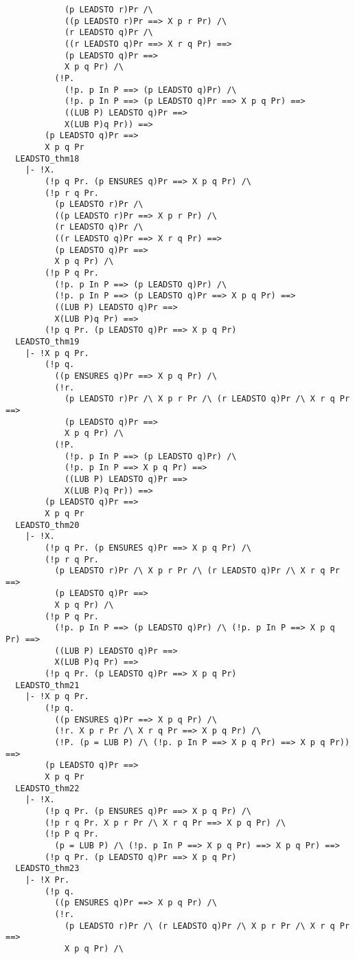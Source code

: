 {\begin{verbatim}
            (p LEADSTO r)Pr /\
            ((p LEADSTO r)Pr ==> X p r Pr) /\
            (r LEADSTO q)Pr /\
            ((r LEADSTO q)Pr ==> X r q Pr) ==>
            (p LEADSTO q)Pr ==>
            X p q Pr) /\
          (!P.
            (!p. p In P ==> (p LEADSTO q)Pr) /\
            (!p. p In P ==> (p LEADSTO q)Pr ==> X p q Pr) ==>
            ((LUB P) LEADSTO q)Pr ==>
            X(LUB P)q Pr)) ==>
        (p LEADSTO q)Pr ==>
        X p q Pr
  LEADSTO_thm18
    |- !X.
        (!p q Pr. (p ENSURES q)Pr ==> X p q Pr) /\
        (!p r q Pr.
          (p LEADSTO r)Pr /\
          ((p LEADSTO r)Pr ==> X p r Pr) /\
          (r LEADSTO q)Pr /\
          ((r LEADSTO q)Pr ==> X r q Pr) ==>
          (p LEADSTO q)Pr ==>
          X p q Pr) /\
        (!p P q Pr.
          (!p. p In P ==> (p LEADSTO q)Pr) /\
          (!p. p In P ==> (p LEADSTO q)Pr ==> X p q Pr) ==>
          ((LUB P) LEADSTO q)Pr ==>
          X(LUB P)q Pr) ==>
        (!p q Pr. (p LEADSTO q)Pr ==> X p q Pr)
  LEADSTO_thm19
    |- !X p q Pr.
        (!p q.
          ((p ENSURES q)Pr ==> X p q Pr) /\
          (!r.
            (p LEADSTO r)Pr /\ X p r Pr /\ (r LEADSTO q)Pr /\ X r q Pr ==>
            (p LEADSTO q)Pr ==>
            X p q Pr) /\
          (!P.
            (!p. p In P ==> (p LEADSTO q)Pr) /\
            (!p. p In P ==> X p q Pr) ==>
            ((LUB P) LEADSTO q)Pr ==>
            X(LUB P)q Pr)) ==>
        (p LEADSTO q)Pr ==>
        X p q Pr
  LEADSTO_thm20
    |- !X.
        (!p q Pr. (p ENSURES q)Pr ==> X p q Pr) /\
        (!p r q Pr.
          (p LEADSTO r)Pr /\ X p r Pr /\ (r LEADSTO q)Pr /\ X r q Pr ==>
          (p LEADSTO q)Pr ==>
          X p q Pr) /\
        (!p P q Pr.
          (!p. p In P ==> (p LEADSTO q)Pr) /\ (!p. p In P ==> X p q Pr) ==>
          ((LUB P) LEADSTO q)Pr ==>
          X(LUB P)q Pr) ==>
        (!p q Pr. (p LEADSTO q)Pr ==> X p q Pr)
  LEADSTO_thm21
    |- !X p q Pr.
        (!p q.
          ((p ENSURES q)Pr ==> X p q Pr) /\
          (!r. X p r Pr /\ X r q Pr ==> X p q Pr) /\
          (!P. (p = LUB P) /\ (!p. p In P ==> X p q Pr) ==> X p q Pr)) ==>
        (p LEADSTO q)Pr ==>
        X p q Pr
  LEADSTO_thm22
    |- !X.
        (!p q Pr. (p ENSURES q)Pr ==> X p q Pr) /\
        (!p r q Pr. X p r Pr /\ X r q Pr ==> X p q Pr) /\
        (!p P q Pr.
          (p = LUB P) /\ (!p. p In P ==> X p q Pr) ==> X p q Pr) ==>
        (!p q Pr. (p LEADSTO q)Pr ==> X p q Pr)
  LEADSTO_thm23
    |- !X Pr.
        (!p q.
          ((p ENSURES q)Pr ==> X p q Pr) /\
          (!r.
            (p LEADSTO r)Pr /\ (r LEADSTO q)Pr /\ X p r Pr /\ X r q Pr ==>
            X p q Pr) /\

\end{verbatim}}
